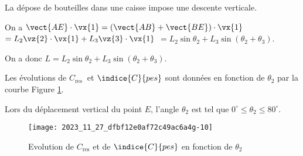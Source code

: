 %
%
%
%

La dépose de bouteilles dans une caisse impose une descente verticale.%

\ifprof
\begin{corrige}
On a 
$\vect{AE}\cdot \vx{1} = \left(\vect{AB} + \vect{BE}\right) \cdot \vx{1}$
$= L_2 \vz{2}\cdot \vx{1} + L_3\vz{3}\cdot \vx{1}$ 
$= L_2 \sin \theta_2 + L_3\sin \left(\theta_2+\theta_3\right)$.

On a donc $L = L_2 \sin \theta_2 + L_3 \sin \left(\theta_2+\theta_3\right)$.

\end{corrige}
\else
\fi

\ifprof
\else

Les évolutions de $C_{\text {res }}$ et $\indice{C}{pes}$ sont données en fonction de $\theta_{2}$ par la courbe Figure \ref{fig:09}.

\begin{rem}
Lors du déplacement vertical du point $E$, l'angle $\theta_{2}$ est tel que $0^{\circ} \leq \theta_{2} \leq 80^{\circ}$.
\end{rem}

\begin{figure}[!h]
\centering
\texttt{[image: 2023\_11\_27\_dfbf12e0af72c49ac6a4g-10]}
\caption{Evolution de $C_{\text{res}}$ et de $\indice{C}{pes}$ en fonction de $\theta_{2}$ \label{fig:09}}
\end{figure}

